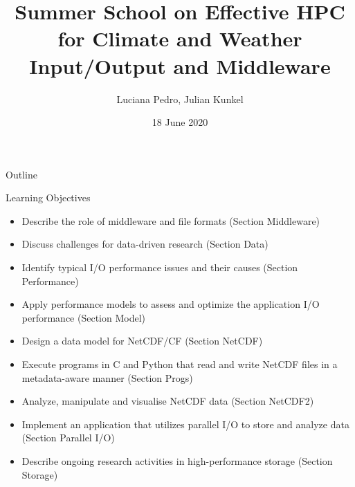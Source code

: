 \documentclass[compress,11pt,xcolor=svgnames,aspectratio=169]{beamer}
\title[Summer School -- Input/Output and Middleware -- NetCDF Examples]{Summer School on Effective HPC for Climate and Weather \\[0.5cm] Input/Output and Middleware}
\author[Pedro, Kunkel]{Luciana Pedro, Julian Kunkel
}
\institute[WP4 Team]{Department of Computer Science, University of Reading}
\date{18 June 2020}
\begin{document}
\begin{frame}[plain]
    \titlepage
\end{frame}

\begin{withoutheadline}
\begin{frame}{Outline}
    \begin{centering}
    \tableofcontents[hideallsubsections]
    \end{centering}

    \disclaimer
\end{frame}
\end{withoutheadline}


\begin{frame}[fragile]{Learning Objectives}

\begin{itemize}
  \item Describe the role of middleware and file formats (Section Middleware)
  \item Discuss challenges for data-driven research (Section Data)
  \item Identify typical I/O performance issues and their causes (Section Performance)
  \item Apply performance models to assess and optimize the application I/O performance (Section Model)
  \item Design a data model for NetCDF/CF (Section NetCDF)
  \item Execute programs in C and Python that read and write NetCDF files in a metadata-aware manner (Section Progs)
  \item Analyze, manipulate and visualise NetCDF data (Section NetCDF2)
  \item Implement an application that utilizes parallel I/O to store and analyze data (Section Parallel I/O)
  \item Describe ongoing research activities in high-performance storage (Section Storage)
\end{itemize}

\end{frame}
\end{document}
